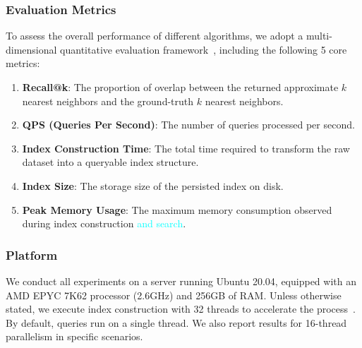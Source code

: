 \documentclass[sigconf, nonacm]{acmart}
\begin{document}
	
	
	
	
	
	\subsubsection{Evaluation Metrics}
	
	To assess the overall performance of different algorithms, we adopt a multi-dimensional quantitative evaluation framework~\cite{compare}, including the following 5 core metrics:
	
	\begin{enumerate}
		
		\item \textbf{Recall@k}: The proportion of overlap between the returned approximate $k$ nearest neighbors and the ground-truth $k$ nearest neighbors.
		\item \textbf{QPS (Queries Per Second)}: The number of queries processed per second.
		\item \textbf{Index Construction Time}: The total time required to transform the raw dataset into a queryable index structure.
		\item \textbf{Index Size}: The storage size of the persisted index on disk.
		\item \textbf{Peak Memory Usage}: The maximum memory consumption observed during index construction \textcolor{cyan}{and search}.
	\end{enumerate}
	
	
	
	
	
	\subsubsection{Platform}
	
	
	We conduct all experiments on a server running Ubuntu 20.04, equipped with an AMD EPYC 7K62 processor (2.6GHz) and 256GB of RAM. Unless otherwise stated, we execute index construction with 32 threads to accelerate the process~\cite{benchmarkindex}. By default, queries run on a single thread. We also report results for 16-thread parallelism in specific scenarios.
	
\end{document}
